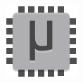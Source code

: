 \documentclass{beamer}
\begin{document}
\begin{frame}
\begin{center}
\begin{minipage}{0.6\textwidth}
		\end{minipage}
		\hspace{0pt plus 1 filll}
		\begin{minipage}{0.35\textwidth}
			\begin{figure}[h]
				\includegraphics[scale=1.5]{umps3}
			\end{figure}
		\end{minipage}
	\end{center}
\end{frame}
\end{document}
